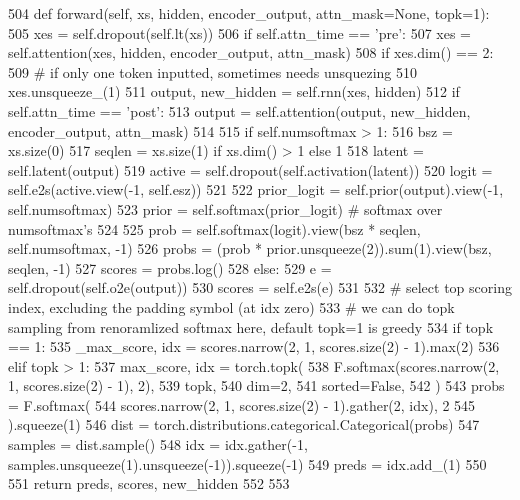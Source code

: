 \begin{DoxyCode}
504     \textcolor{keyword}{def }forward(self, xs, hidden, encoder\_output, attn\_mask=None, topk=1):
505         xes = self.dropout(self.lt(xs))
506         \textcolor{keywordflow}{if} self.attn\_time == \textcolor{stringliteral}{'pre'}:
507             xes = self.attention(xes, hidden, encoder\_output, attn\_mask)
508         \textcolor{keywordflow}{if} xes.dim() == 2:
509             \textcolor{comment}{# if only one token inputted, sometimes needs unsquezing}
510             xes.unsqueeze\_(1)
511         output, new\_hidden = self.rnn(xes, hidden)
512         \textcolor{keywordflow}{if} self.attn\_time == \textcolor{stringliteral}{'post'}:
513             output = self.attention(output, new\_hidden, encoder\_output, attn\_mask)
514 
515         \textcolor{keywordflow}{if} self.numsoftmax > 1:
516             bsz = xs.size(0)
517             seqlen = xs.size(1) \textcolor{keywordflow}{if} xs.dim() > 1 \textcolor{keywordflow}{else} 1
518             latent = self.latent(output)
519             active = self.dropout(self.activation(latent))
520             logit = self.e2s(active.view(-1, self.esz))
521 
522             prior\_logit = self.prior(output).view(-1, self.numsoftmax)
523             prior = self.softmax(prior\_logit)  \textcolor{comment}{# softmax over numsoftmax's}
524 
525             prob = self.softmax(logit).view(bsz * seqlen, self.numsoftmax, -1)
526             probs = (prob * prior.unsqueeze(2)).sum(1).view(bsz, seqlen, -1)
527             scores = probs.log()
528         \textcolor{keywordflow}{else}:
529             e = self.dropout(self.o2e(output))
530             scores = self.e2s(e)
531 
532         \textcolor{comment}{# select top scoring index, excluding the padding symbol (at idx zero)}
533         \textcolor{comment}{# we can do topk sampling from renoramlized softmax here, default topk=1 is greedy}
534         \textcolor{keywordflow}{if} topk == 1:
535             \_max\_score, idx = scores.narrow(2, 1, scores.size(2) - 1).max(2)
536         \textcolor{keywordflow}{elif} topk > 1:
537             max\_score, idx = torch.topk(
538                 F.softmax(scores.narrow(2, 1, scores.size(2) - 1), 2),
539                 topk,
540                 dim=2,
541                 sorted=\textcolor{keyword}{False},
542             )
543             probs = F.softmax(
544                 scores.narrow(2, 1, scores.size(2) - 1).gather(2, idx), 2
545             ).squeeze(1)
546             dist = torch.distributions.categorical.Categorical(probs)
547             samples = dist.sample()
548             idx = idx.gather(-1, samples.unsqueeze(1).unsqueeze(-1)).squeeze(-1)
549         preds = idx.add\_(1)
550 
551         \textcolor{keywordflow}{return} preds, scores, new\_hidden
552 
553 
\end{DoxyCode}


